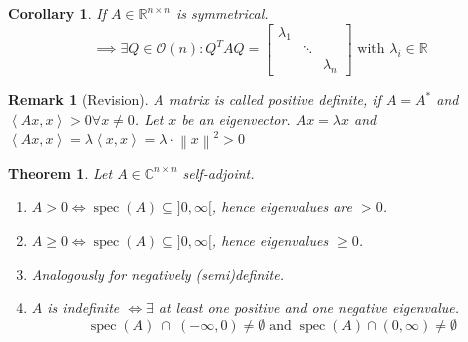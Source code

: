\documentclass{article}
\newtheorem{theorem}{Theorem}  \numberwithin{theorem}{section}
\newtheorem{remark}{Remark}  \numberwithin{remark}{section}
\newtheorem{corollary}{Corollary}  \numberwithin{corollary}{section}
\newcommand{\angel}[1]{\left\langle#1\right\rangle}
\newcommand{\norm}[1]{\left\|#1\right\|}
\begin{document}
\begin{corollary}
  If $A \in \mathbb R^{n \times n}$ is symmetrical.
  \[ \implies \exists Q \in \mathcal O(n): Q^T AQ = \begin{bmatrix} \lambda_1 & & \\ & \ddots & \\ & & \lambda_n \end{bmatrix} \text{ with } \lambda_i \in \mathbb R \]
\end{corollary}

\begin{remark}[Revision]
  A matrix is called positive definite, if $A = A^*$ and $\angel{Ax,x} > 0 \forall x \neq 0$.
  Let $x$ be an eigenvector. $Ax = \lambda x$ and $\angel{Ax,x} = \lambda \angel{x,x} = \lambda \cdot \norm{x}^2 > 0$
\end{remark}

\begin{theorem} %
  Let $A \in \mathbb C^{n \times n}$ self-adjoint.
  \begin{enumerate}
    \item $A > 0 \iff \operatorname{spec}(A) \subseteq ]0,\infty[$, hence eigenvalues are $> 0$.
    \item $A \geq 0 \iff \operatorname{spec}(A) \subseteq ]0, \infty[$, hence eigenvalues $\geq 0$.
    \item Analogously for negatively (semi)definite.
    \item $A$ is indefinite $\iff \exists$ at least one positive and one negative eigenvalue.
      \[ \operatorname{spec}(A) \:\cap\: (-\infty,0) \neq \emptyset \operatorname{ and } \operatorname{spec}(A) \cap (0,\infty) \neq \emptyset \]
  \end{enumerate}
\end{theorem}
\end{document}
